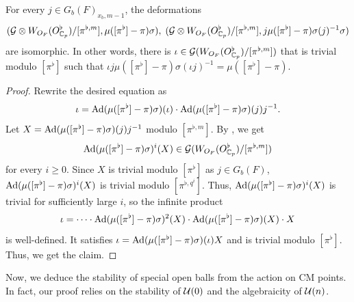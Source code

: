 \documentclass[12pt,reqno]{amsart}
\begin{document}
\begin{prop} \label{prop:isom_deformation}
    For every $j \in G_b(F)_{x_b, m-1}$, the deformations
    \[
        ({\mathcal{G}} \otimes W_{O_F}(O_{\mathbb{C}_p}^\flat)/[\pi^{\flat ,m}], \mu([\pi^\flat] - \pi) \sigma) ,\;
        ({\mathcal{G}} \otimes W_{O_F}(O_{\mathbb{C}_p}^\flat)/[\pi^{\flat ,m}], j \mu([\pi^\flat] - \pi) \sigma(j)^{-1} \sigma)
    \]
    are isomorphic. In other words, there is $\iota \in {\mathcal{G}}(W_{O_F}(O_{\mathbb{C}_p}^\flat)/[\pi^{\flat ,m}])$ that is trivial modulo $[\pi^\flat]$ such that
    $
        \iota j \mu([\pi^\flat] - \pi) \sigma(\iota j)^{-1} = \mu([\pi^\flat] - \pi). 
    $
\end{prop}

\begin{proof}
    Rewrite the desired equation as
    \[
        \iota = {\operatorname{Ad}}(\mu([\pi^\flat] - \pi)\sigma)(\iota) \cdot {\operatorname{Ad}}(\mu([\pi^\flat] - \pi) \sigma)(j) j^{-1}. 
    \]
    Let $X = {\operatorname{Ad}}(\mu([\pi^\flat] - \pi) \sigma)(j) j^{-1}$ modulo $[\pi^{\flat, m}]$. By , we get
    \[
        {\operatorname{Ad}}(\mu([\pi^\flat] - \pi)\sigma)^i(X) \in {\mathcal{G}}(W_{O_F}(O_{\mathbb{C}_p}^\flat)/[\pi^{\flat, m}])
    \]
    for every $i \geq 0$. Since $X$ is trivial modulo $[\pi^\flat]$ as $j \in G_b(F)$, ${\operatorname{Ad}}(\mu([\pi^\flat] - \pi)\sigma)^i(X)$ is trivial modulo $[\pi^{\flat, q^i}]$. Thus, ${\operatorname{Ad}}(\mu([\pi^\flat] - \pi)\sigma)^i(X)$ is trivial for sufficiently large $i$, so the infinite product
    \[
        \iota = \cdots \cdot {\operatorname{Ad}}(\mu([\pi^\flat] - \pi) \sigma)^2(X) \cdot  {\operatorname{Ad}}(\mu([\pi^\flat] - \pi) \sigma)(X) \cdot X 
    \]
    is well-defined. It satisfies $\iota = {\operatorname{Ad}}(\mu([\pi^\flat] - \pi)\sigma)(\iota) X$ and is trivial modulo $[\pi^\flat]$. Thus, we get the claim. 
\end{proof}

Now, we deduce the stability of special open balls from the action on CM points. In fact, our proof relies on the stability of ${\mathcal{U}}(0)$ and the algebraicity of ${\mathcal{U}}(n)$. 
\end{document}
